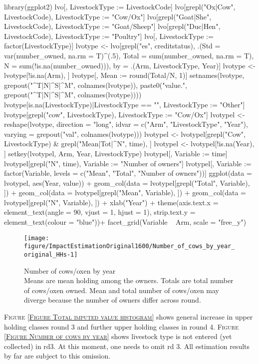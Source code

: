 \begin{Schunk}
\begin{Sinput}
library(ggplot2)
lvo[, LivestockType := LivestockCode]
lvo[grepl("Ox|Cow", LivestockCode), LivestockType := "Cow/Ox"]
lvo[grepl("Goat|She", LivestockCode), LivestockType := "Goat/Sheep"]
lvo[grepl("Duc|Hen", LivestockCode), LivestockType := "Poultry"]
lvo[, LivestockType := factor(LivestockType)]
lvotype <- lvo[grepl("es", creditstatus), 
  .(Std = var(number_owned, na.rm = T)^(.5), 
    Total = sum(number_owned, na.rm = T), 
    N = sum(!is.na(number_owned))), 
    by = .(Arm,  LivestockType, Year)]
lvotype <- lvotype[!is.na(Arm), ]
lvotype[, Mean := round(Total/N, 1)]
setnames(lvotype, grepout("^T|N|^S|^M", colnames(lvotype)), 
  paste0("value.", grepout("^T|N|^S|^M", colnames(lvotype))))
lvotype[is.na(LivestockType)|LivestockType == "", LivestockType := "Other"]
lvotype[grepl("cow", LivestockType), LivestockType := "Cow/Ox"]
lvotypel <- reshape(lvotype, direction = "long", 
  idvar = c("Arm", "LivestockType", "Year"),
  varying = grepout("val", colnames(lvotype)))
lvotypel <- lvotypel[grepl("Cow", LivestockType) & grepl("Mean|Tot|^N", time), ]
lvotypel <- lvotypel[!is.na(Year), ]
setkey(lvotypel, Arm, Year, LivestockType)
lvotypel[, Variable := time]
lvotypel[grepl("N", time), Variable := "Number of owners"]
lvotypel[, Variable := factor(Variable, levels = c("Mean", "Total", "Number of owners"))]
ggplot(data = lvotypel, aes(Year, value)) + 
  geom_col(data = lvotypel[grepl("Total", Variable), ]) +
  geom_col(data = lvotypel[grepl("Mean", Variable), ]) +
  geom_col(data = lvotypel[grepl("N", Variable), ]) +
  xlab("Year") +
  theme(axis.text.x = element_text(angle = 90, vjust = 1, hjust = 1), 
    strip.text.y = element_text(colour = "blue"))+
  facet_grid(Variable ~ Arm, scale = "free_y")
\end{Sinput}
\begin{figure}

{\centering \texttt{[image: figure/ImpactEstimationOriginal1600/Number\_of\_cows\_by\_year\_original\_HHs-1]} 

}

\caption{Number of cows/oxen by year\\ {\footnotesize Means are mean holding among the owners. Totals are total number of cows/oxen owned. Mean and total number of cows/oxen may diverge because the number of owners differ across round.\setlength{\baselineskip}{8pt}}}\label{Figure Number of cows by year original HHs}
\end{figure}
\end{Schunk}
\begin{palepinkleftbar}
\begin{finding}
\textsc{\small Figure \ref{Figure Total imputed value histogram}} shows general increase in upper holding classes round 3 and further upper holding classes in round 4. \textsc{\small Figure \ref{Figure Number of cows by year}} shows livestock type is not entered (yet collected) in rd3. At this moment, one needs to omit rd 3. All estimation results by far are subject to this omission.
\end{finding}
\end{palepinkleftbar}


